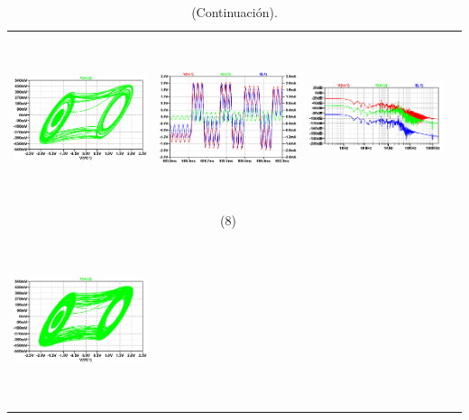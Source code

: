 \documentclass{rbf}
\begin{document}
\begin{table}[h]
    \centering
    \caption{\label{tab:r_0 fijo y variando R CCC modificado} (Continuación).}\\
    \begin{tabular}{c c c c}
        \hline  
        \includegraphics[width=5cm,height=5cm]{R7/1419atractorC.png}&
        \includegraphics[width=5cm,height=5cm]{R7/1419tsC.png}&
        \includegraphics[width=5cm,height=5cm]{R7/1419fftC.png}&\\
        & (8) &  \\ 
        \includegraphics[width=5cm,height=5cm]{R7/1419.44 C220 800m atractor.png}&

\end{tabular}
\end{table}
\end{document}
